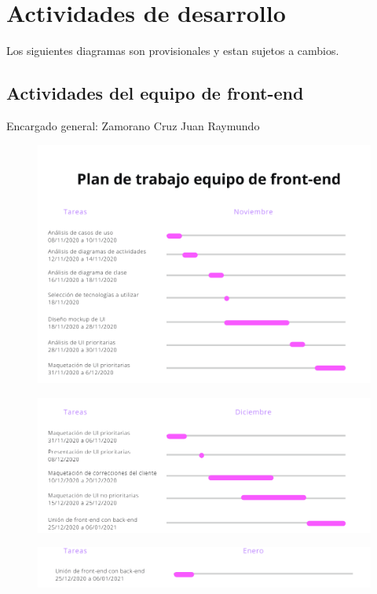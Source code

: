 \documentclass[12pt,letterpaper]{article}
\begin{document}
    \newpage
    \section{Actividades de desarrollo}
        Los siguientes diagramas son provisionales y estan sujetos a cambios.
        \subsection{Actividades del equipo de front-end}
        Encargado general: Zamorano Cruz Juan Raymundo
            \begin{figure}[H]
                \centering
                \includegraphics [scale=0.6]{gantt/frontNov}
            \end{figure}
            \begin{figure}[H]
                \centering
                \includegraphics [scale=0.6]{gantt/frontDec}
            \end{figure}
            \begin{figure}[H]
                \centering
                \includegraphics [scale=0.6]{gantt/frontEne}
            \end{figure}
        \newpage
\end{document}
